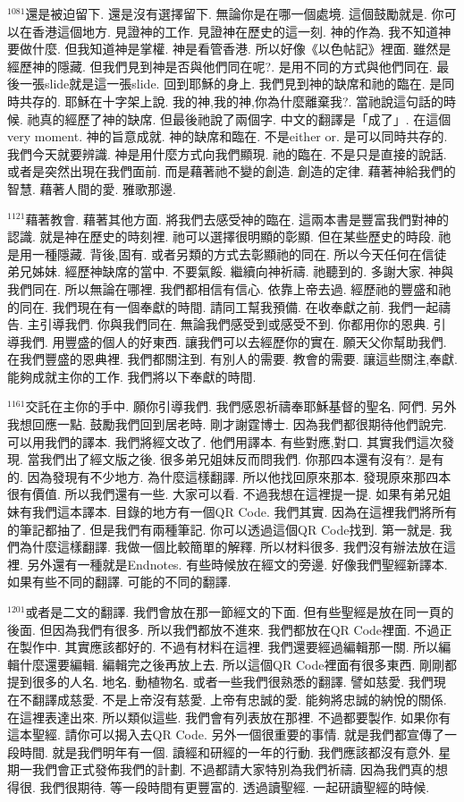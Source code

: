 \documentclass{book}
\begin{document}
$^{1081}$還是被迫留下.
還是沒有選擇留下.
無論你是在哪一個處境.
這個鼓勵就是.
你可以在香港這個地方.
見證神的工作.
見證神在歷史的這一刻.
神的作為.
我不知道神要做什麼.
但我知道神是掌權.
神是看管香港.
所以好像《以色帖記》裡面.
雖然是經歷神的隱藏.
但我們見到神是否與他們同在呢?.
是用不同的方式與他們同在.
最後一張slide就是這一張slide.
回到耶穌的身上.
我們見到神的缺席和祂的臨在.
是同時共存的.
耶穌在十字架上說.
我的神,我的神,你為什麼離棄我?.
當祂說這句話的時候.
祂真的經歷了神的缺席.
但最後祂說了兩個字.
中文的翻譯是「成了」.
在這個very moment.
神的旨意成就.
神的缺席和臨在.
不是either or.
是可以同時共存的.
我們今天就要辨識.
神是用什麼方式向我們顯現.
祂的臨在.
不是只是直接的說話.
或者是突然出現在我們面前.
而是藉著祂不變的創造.
創造的定律.
藉著神給我們的智慧.
藉著人間的愛.
雅歌那邊.

$^{1121}$藉著教會.
藉著其他方面.
將我們去感受神的臨在.
這兩本書是豐富我們對神的認識.
就是神在歷史的時刻裡.
祂可以選擇很明顯的彰顯.
但在某些歷史的時段.
祂是用一種隱藏.
背後,固有.
或者另類的方式去彰顯祂的同在.
所以今天任何在信徒弟兄姊妹.
經歷神缺席的當中.
不要氣餒.
繼續向神祈禱.
祂聽到的.
多謝大家.
神與我們同在.
所以無論在哪裡.
我們都相信有信心.
依靠上帝去過.
經歷祂的豐盛和祂的同在.
我們現在有一個奉獻的時間.
請同工幫我預備.
在收奉獻之前.
我們一起禱告.
主引導我們.
你與我們同在.
無論我們感受到或感受不到.
你都用你的恩典.
引導我們.
用豐盛的個人的好東西.
讓我們可以去經歷你的實在.
願天父你幫助我們.
在我們豐盛的恩典裡.
我們都關注到.
有別人的需要.
教會的需要.
讓這些關注,奉獻.
能夠成就主你的工作.
我們將以下奉獻的時間.

$^{1161}$交託在主你的手中.
願你引導我們.
我們感恩祈禱奉耶穌基督的聖名.
阿們.
另外我想回應一點.
鼓勵我們回到居老時.
剛才謝霆博士.
因為我們都很期待他們說完.
可以用我們的譯本.
我們將經文改了.
他們用譯本.
有些對應,對口.
其實我們這次發現.
當我們出了經文版之後.
很多弟兄姐妹反而問我們.
你那四本還有沒有?.
是有的.
因為發現有不少地方.
為什麼這樣翻譯.
所以他找回原來那本.
發現原來那四本很有價值.
所以我們還有一些.
大家可以看.
不過我想在這裡提一提.
如果有弟兄姐妹有我們這本譯本.
目錄的地方有一個QR Code.
我們其實.
因為在這裡我們將所有的筆記都抽了.
但是我們有兩種筆記.
你可以透過這個QR Code找到.
第一就是.
我們為什麼這樣翻譯.
我做一個比較簡單的解釋.
所以材料很多.
我們沒有辦法放在這裡.
另外還有一種就是Endnotes.
有些時候放在經文的旁邊.
好像我們聖經新譯本.
如果有些不同的翻譯.
可能的不同的翻譯.

$^{1201}$或者是二文的翻譯.
我們會放在那一節經文的下面.
但有些聖經是放在同一頁的後面.
但因為我們有很多.
所以我們都放不進來.
我們都放在QR Code裡面.
不過正在製作中.
其實應該都好的.
不過有材料在這裡.
我們還要經過編輯那一關.
所以編輯什麼還要編輯.
編輯完之後再放上去.
所以這個QR Code裡面有很多東西.
剛剛都提到很多的人名.
地名.
動植物名.
或者一些我們很熟悉的翻譯.
譬如慈愛.
我們現在不翻譯成慈愛.
不是上帝沒有慈愛.
上帝有忠誠的愛.
能夠將忠誠的納悅的關係.
在這裡表達出來.
所以類似這些.
我們會有列表放在那裡.
不過都要製作.
如果你有這本聖經.
請你可以揭入去QR Code.
另外一個很重要的事情.
就是我們都宣傳了一段時間.
就是我們明年有一個.
讀經和研經的一年的行動.
我們應該都沒有意外.
星期一我們會正式發佈我們的計劃.
不過都請大家特別為我們祈禱.
因為我們真的想得很.
我們很期待.
等一段時間有更豐富的.
透過讀聖經.
一起研讀聖經的時候.
\end{document}
